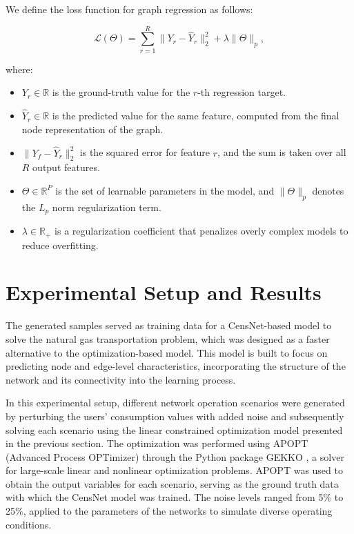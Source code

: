 We define the loss function for graph regression as follows:

\begin{equation}
    \mathcal{L}(\Theta) = \sum_{r=1}^{R} \| Y_r - \hat{Y}_r \|^2_2 + \lambda \|\Theta\|_p,
\end{equation}

\noindent where:

\begin{itemize}
    \item \( Y_r \in \mathbb{R} \) is the ground-truth value for the \( r \)-th regression target.
    \item \( \hat{Y}_r \in \mathbb{R} \) is the predicted value for the same feature, computed from the final node representation of the graph.
    \item \( \| Y_f - \hat{Y}_r \|^2_2 \) is the squared error for feature \( r \), and the sum is taken over all \( R \) output features.
    \item \( \Theta \in \mathbb{R}^{P} \) is the set of learnable parameters in the model, and \( \|\Theta\|_p \) denotes the \( L_p \) norm regularization term.
    \item \( \lambda \in \mathbb{R}_+ \) is a regularization coefficient that penalizes overly complex models to reduce overfitting.
\end{itemize}




\section{Experimental Setup and Results} \label{sec:LinealCensnet_ExperimentalSetup}

The generated samples served as training data for a CensNet-based model to solve the natural gas transportation problem, which was designed as a faster alternative to the optimization-based model. This model is built to focus on predicting node and edge-level characteristics, incorporating the structure of the network and its connectivity into the learning process. 

In this experimental setup, different network operation scenarios were generated by perturbing the users' consumption values with added noise and subsequently solving each scenario using the linear constrained optimization model presented in the previous section. The optimization was performed using APOPT (Advanced Process OPTimizer) through the Python package GEKKO \cite{Beal_Hill_Martin_Hedengren_2018}, a solver for large-scale linear and nonlinear optimization problems. APOPT was used to obtain the output variables for each scenario, serving as the ground truth data with which the CensNet model was trained. The noise levels ranged from 5\% to 25\%, applied to the parameters of the networks to simulate diverse operating conditions. 


